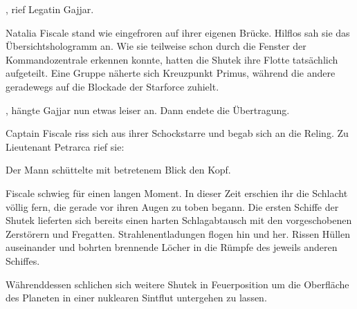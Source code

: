 , rief Legatin Gajjar. 

\par

Natalia Fiscale stand wie eingefroren auf ihrer eigenen Brücke. Hilflos sah sie das Übersichtshologramm an. Wie sie teilweise schon durch die Fenster der Kommandozentrale erkennen konnte, hatten die Shutek ihre Flotte tatsächlich aufgeteilt. Eine Gruppe näherte sich Kreuzpunkt Primus, während die andere geradewegs auf die Blockade der Starforce zuhielt.

\par

, hängte Gajjar nun etwas leiser an.  Dann endete die Übertragung.

\par

Captain Fiscale riss sich aus ihrer Schockstarre und begab sich an die Reling. Zu Lieutenant Petrarca rief sie: 

\par

Der Mann schüttelte mit betretenem Blick den Kopf. 

\par

Fiscale schwieg für einen langen Moment. In dieser Zeit erschien ihr die Schlacht völlig fern, die gerade vor ihren Augen zu toben begann. Die ersten Schiffe der Shutek lieferten sich bereits einen harten Schlagabtausch mit den vorgeschobenen Zerstörern und Fregatten. Strahlenentladungen flogen hin und her. Rissen Hüllen auseinander und bohrten brennende Löcher in die Rümpfe des jeweils anderen Schiffes.

\par

Währenddessen schlichen sich weitere Shutek in Feuerposition um die Oberfläche des Planeten in einer nuklearen Sintflut untergehen zu lassen.

\par


